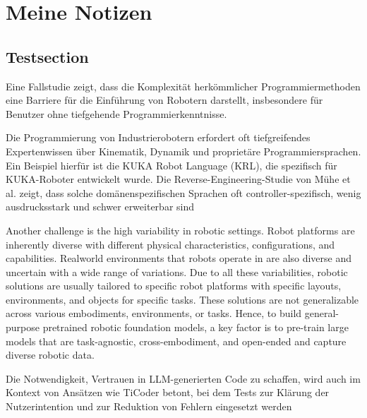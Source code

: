\chapter{Meine Notizen}
\label{cap:Meine Notizen}

\section{Testsection}
\label{sec:Testsection}

Eine Fallstudie zeigt, dass die Komplexität herkömmlicher Programmiermethoden eine Barriere für die Einführung von Robotern darstellt, insbesondere für Benutzer ohne tiefgehende Programmierkenntnisse.\cite{bhat2024groundingllmsrobottask}

Die Programmierung von Industrierobotern erfordert oft tiefgreifendes Expertenwissen über Kinematik, Dynamik und proprietäre Programmiersprachen. Ein Beispiel hierfür ist die KUKA Robot Language (KRL), die spezifisch für KUKA-Roboter entwickelt wurde. Die Reverse-Engineering-Studie von Mühe et al. zeigt, dass solche domänenspezifischen Sprachen oft controller-spezifisch, wenig ausdrucksstark und schwer erweiterbar sind \cite{mühe2010reverseengineeringkukarobotlanguage}

Another challenge is the high variability in robotic settings. Robot platforms are inherently diverse with different
physical characteristics, configurations, and capabilities. Realworld environments that robots operate in are also diverse
and uncertain with a wide range of variations. Due to all
these variabilities, robotic solutions are usually tailored to
specific robot platforms with specific layouts, environments,
and objects for specific tasks. These solutions are not generalizable across various embodiments, environments, or tasks.
Hence, to build general-purpose pretrained robotic foundation
models, a key factor is to pre-train large models that are
task-agnostic, cross-embodiment, and open-ended and capture
diverse robotic data.  \cite{firoozi2023foundationmodelsroboticsapplications}

Die Notwendigkeit, Vertrauen in LLM-generierten Code zu schaffen, wird auch im Kontext von Ansätzen wie TiCoder betont, bei dem Tests zur Klärung der Nutzerintention und zur Reduktion von Fehlern eingesetzt werden  \cite{Fakhoury_2024}